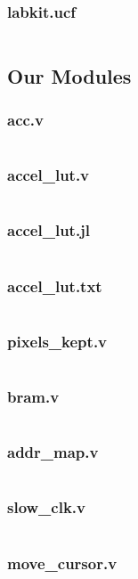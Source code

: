 \documentclass{article}
\begin{document}
\subsubsection{labkit.ucf}
\inputminted[linenos]{verilog}{../../src/labkit.ucf}

\subsection{Our Modules}
\subsubsection{acc.v}
\inputminted[linenos]{verilog}{../../src/acc.v}
\subsubsection{accel\_lut.v}
\inputminted[linenos]{verilog}{../../src/accel_lut.v}
\subsubsection{accel\_lut.jl}
\inputminted[linenos]{julia}{../../src/accel_lut.jl}
\subsubsection{accel\_lut.txt}
\inputminted[linenos]{todotxt}{../../src/accel_lut.txt}
\subsubsection{pixels\_kept.v}
\inputminted[linenos]{verilog}{../../src/pixels_kept.v}
\subsubsection{bram.v}
\inputminted[linenos]{verilog}{../../src/bram.v}
\subsubsection{addr\_map.v}
\inputminted[linenos]{verilog}{../../src/addr_map.v}
\subsubsection{slow\_clk.v}
\inputminted[linenos]{verilog}{../../src/slow_clk.v}
\subsubsection{move\_cursor.v}
\inputminted[linenos]{verilog}{../../src/move_cursor.v}
\end{document}
